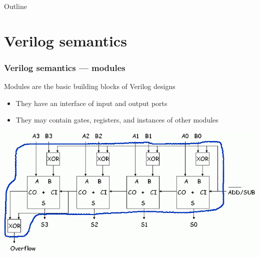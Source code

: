 \documentclass[mathserif]{beamer}
\begin{document}
\begin{frame}{Outline}
  \tableofcontents
\end{frame}




\section[Verilog semantics]{Verilog semantics}


\begin{frame}
\frametitle{Verilog semantics --- modules}

Modules are the basic building blocks of Verilog designs
\begin{itemize}
\item They have an interface of input and output ports
\item They may contain gates, registers, and instances of other modules
\end{itemize}

\bigskip

\begin{center}
\includegraphics[scale=0.4]{adder_subtractor.png}
\end{center}

\end{frame}
\end{document}
